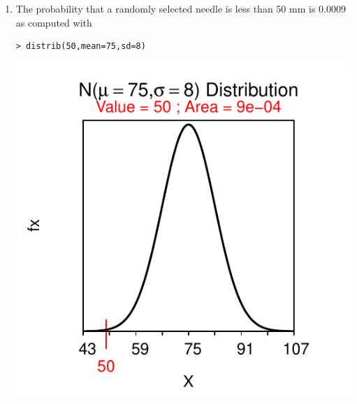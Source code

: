 \documentclass[10pt,openany]{book}\usepackage[]{graphicx}\usepackage[]{color}
\makeatletter
\newenvironment{kframe}{%
 \def\at@end@of@kframe{}%
 \ifinner\ifhmode%
  \def\at@end@of@kframe{\end{minipage}}%
  \begin{minipage}{\columnwidth}%
 \fi\fi%
 \def\FrameCommand##1{\hskip\@totalleftmargin \hskip-\fboxsep
 \colorbox{shadecolor}{##1}\hskip-\fboxsep
     \hskip-\linewidth \hskip-\@totalleftmargin \hskip\columnwidth}%
 \MakeFramed {\advance\hsize-\width
   \@totalleftmargin\z@ \linewidth\hsize
   \@setminipage}}%
 {\par\unskip\endMakeFramed%
 \at@end@of@kframe}
\newenvironment{knitrout}{}{} %
\makeatother
\begin{document}
\begin{itemize}
\begin{enumerate}
\begin{knitrout}
{}



\end{knitrout}
    \item The probability that a randomly selected needle is less than 50 mm is 0.0009 as computed with
\begin{knitrout}
\color{fgcolor}\begin{kframe}
\begin{verbatim}
> distrib(50,mean=75,sd=8)
\end{verbatim}
\end{kframe}

{\centering \includegraphics[width=.4\linewidth]{Figs/unnamed-chunk-298-1} 

}



\end{knitrout}
  \end{enumerate}

\end{itemize}





\end{document}
